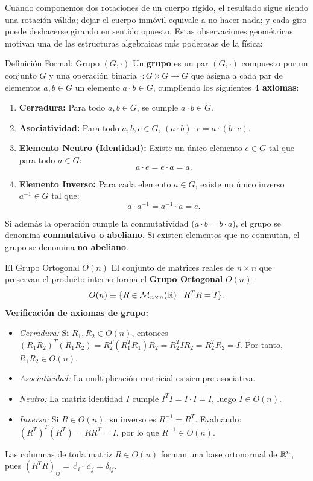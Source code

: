 \documentclass[11pt,letterpaper]{article}
\begin{document}
Cuando componemos dos rotaciones de un cuerpo rígido, el resultado sigue siendo una rotación válida; dejar el cuerpo inmóvil equivale a no hacer nada; y cada giro puede deshacerse girando en sentido opuesto. Estas observaciones geométricas motivan una de las estructuras algebraicas más poderosas de la física:

\begin{theorembox}{Definición Formal: Grupo $(G, \cdot)$}
Un \textbf{grupo} es un par $(G, \cdot)$ compuesto por un conjunto $G$ y una operación binaria $\cdot: G \times G \to G$ que asigna a cada par de elementos $a, b \in G$ un elemento $a \cdot b \in G$, cumpliendo los siguientes \textbf{4 axiomas}:
\begin{enumerate}
    \item \textbf{Cerradura:} Para todo $a, b \in G$, se cumple $a \cdot b \in G$.
    \item \textbf{Asociatividad:} Para todo $a, b, c \in G$, $(a \cdot b) \cdot c = a \cdot (b \cdot c)$.
    \item \textbf{Elemento Neutro (Identidad):} Existe un único elemento $e \in G$ tal que para todo $a \in G$:
    \[
    a \cdot e = e \cdot a = a.
    \]
    \item \textbf{Elemento Inverso:} Para cada elemento $a \in G$, existe un único inverso $a^{-1} \in G$ tal que:
    \[
    a \cdot a^{-1} = a^{-1} \cdot a = e.
    \]
\end{enumerate}
Si además la operación cumple la conmutatividad ($a \cdot b = b \cdot a$), el grupo se denomina \textbf{conmutativo o abeliano}. Si existen elementos que no conmutan, el grupo se denomina \textbf{no abeliano}.
\end{theorembox}

\begin{theorembox}{El Grupo Ortogonal $O(n)$}
El conjunto de matrices reales de $n \times n$ que preservan el producto interno forma el \textbf{Grupo Ortogonal} $O(n)$:
\[
O(n) \equiv \{ R \in \mathcal{M}_{n\times n}(\mathbb{R}) \mid R^T R = I \}.
\]
\textbf{Verificación de axiomas de grupo:}
\begin{itemize}
    \item \emph{Cerradura:} Si $R_1, R_2 \in O(n)$, entonces $(R_1 R_2)^T (R_1 R_2) = R_2^T (R_1^T R_1) R_2 = R_2^T I R_2 = R_2^T R_2 = I$. Por tanto, $R_1 R_2 \in O(n)$.
    \item \emph{Asociatividad:} La multiplicación matricial es siempre asociativa.
    \item \emph{Neutro:} La matriz identidad $I$ cumple $I^T I = I \cdot I = I$, luego $I \in O(n)$.
    \item \emph{Inverso:} Si $R \in O(n)$, su inverso es $R^{-1} = R^T$. Evaluando: $(R^T)^T (R^T) = R R^T = I$, por lo que $R^{-1} \in O(n)$.
\end{itemize}
Las columnas de toda matriz $R \in O(n)$ forman una base ortonormal de $\mathbb{R}^n$, pues $(R^T R)_{ij} = \vec{c}_i \cdot \vec{c}_j = \delta_{ij}$.
\end{theorembox}
\end{document}
